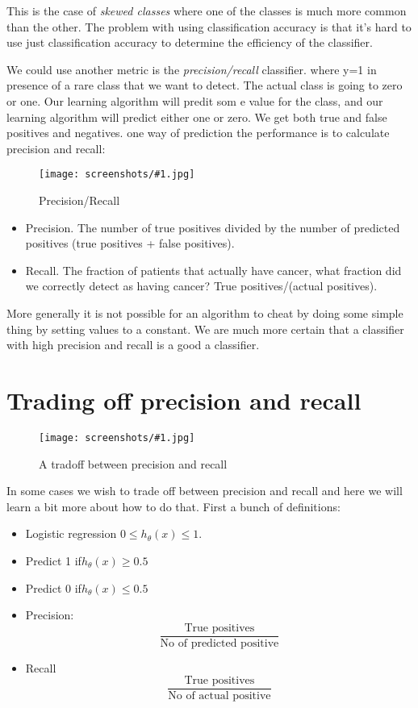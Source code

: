 \documentclass[a4, 12pt, english, USenglish]{scrreprt}
\newcommand{\zcreenshot}[3]{
\begin{figure}[htb]
\texttt{[image: screenshots/\#1.jpg]}
\label{#1}
\caption{#2}
\end{figure}}
\newcommand{\screenshot}[2]{
\begin{figure}[htb]
\texttt{[image: screenshots/\#1.jpg]}
\label{#1}
\caption{#2}
\end{figure}}
\newcommand{\idx}[1]{{\em #1}\index{#1}}
\begin{document}
This is the case of \idx{skewed classes} where one of the classes is
much more common than the other.  The problem with using
classification accuracy is that it's hard to use just classification
accuracy to determine the efficiency of the classifier.

We could use another metric is the \idx{precision/recall}
classifier. where y=1  in presence of a rare class that we want to
detect.    The actual class is going to zero or one. Our learning
algorithm will predit som e value for the class, and our learning
algorithm will predict either one or zero.   We get both true and
false positives and negatives.  one way of prediction the performance
is to calculate precision and recall:

\screenshot{precisionrecall}{Precision/Recall}

\begin{itemize}
 \item Precision.  The number of true positives divided by the number
   of predicted positives (true positives + false positives).

\item Recall.   The fraction of patients that actually have cancer,
  what fraction did we correctly detect as having cancer?  True
  positives/(actual positives).
\end{itemize}

More generally it is not possible for an algorithm to cheat by doing
some simple thing by setting values to a constant.  We are much more
certain that a classifier with high precision and recall is a good a
classifier.



\section{Trading off precision and recall}
\zcreenshot{precisionrecalltradeoff}{A tradoff between precision and recall}{70mm}

In some cases we wish to trade off between precision and recall and
here we will learn a bit more about how to do that.  First a bunch of
definitions:

\begin{itemize}
\item Logistic regression \(0 \leq h_\theta(x) \leq 1\).
\item Predict 1 if\(h_\theta(x) \geq 0.5 \)
\item Predict 0 if\(h_\theta(x) \le 0.5 \)
\item Precision:  
\[
\frac{\mbox{True positives}}{\mbox{No of predicted positive}}
\]

\item Recall
\[
\frac{\mbox{True positives}}{\mbox{No of actual positive}}
\]
\end{itemize}
\end{document}
